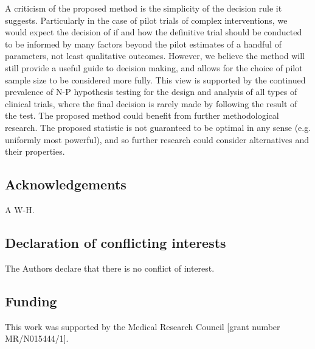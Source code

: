 \documentclass[AMA,STIX1COL]{WileyNJD-v2}
\begin{document}
A criticism of the proposed method is the simplicity of the decision rule it suggests. Particularly in the case of pilot trials of complex interventions, we would expect the decision of if and how the definitive trial should be conducted to be informed by many factors beyond the pilot estimates of a handful of parameters, not least qualitative outcomes. However, we believe the method will still provide a useful guide to decision making, and allows for the choice of pilot sample size to be considered more fully. This view is supported by the continued prevalence of N-P hypothesis testing for the design and analysis of all types of clinical trials, where the final decision is rarely made by following the result of the test. The proposed method could benefit from further methodological research. The proposed statistic is not guaranteed to be optimal in any sense (e.g. uniformly most powerful), and so further research could consider alternatives and their properties.


\subsection*{Acknowledgements}
A W-H.

\subsection*{Declaration of conflicting interests}

The Authors declare that there is no conflict of interest.

\subsection*{Funding}

This work was supported by the Medical Research Council [grant number MR/N015444/1].

%


\appendix
\end{document}
